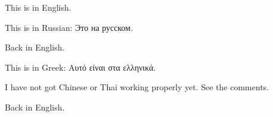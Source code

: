 \documentclass[pagesize=auto]{scrbook}
\begin{document}
This is in English.

This is in Russian:
Это на русском.

Back in English.

This is in Greek:
Αυτό είναι στα ελληνικά.

I have not got Chinese or Thai working properly yet. See the comments.




Back in English.
\end{document}
